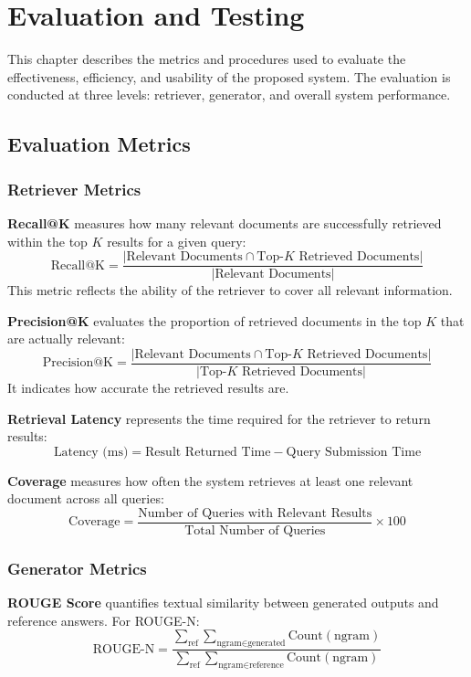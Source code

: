\chapter{Evaluation and Testing}

This chapter describes the metrics and procedures used to evaluate the effectiveness, efficiency, and usability of the proposed system. The evaluation is conducted at three levels: retriever, generator, and overall system performance.

\section{Evaluation Metrics}

\subsection{Retriever Metrics}

\textbf{Recall@K} measures how many relevant documents are successfully retrieved within the top $K$ results for a given query:
\[
\text{Recall@K} = 
\frac{\lvert \text{Relevant Documents} \cap \text{Top-}K \text{ Retrieved Documents} \rvert}
{\lvert \text{Relevant Documents} \rvert}
\]
This metric reflects the ability of the retriever to cover all relevant information.

\textbf{Precision@K} evaluates the proportion of retrieved documents in the top $K$ that are actually relevant:
\[
\text{Precision@K} =
\frac{\lvert \text{Relevant Documents} \cap \text{Top-}K \text{ Retrieved Documents} \rvert}
{\lvert \text{Top-}K \text{ Retrieved Documents} \rvert}
\]
It indicates how accurate the retrieved results are.

\textbf{Retrieval Latency} represents the time required for the retriever to return results:
\[
\text{Latency (ms)} = \text{Result Returned Time} - \text{Query Submission Time}
\]

\textbf{Coverage} measures how often the system retrieves at least one relevant document across all queries:
\[
\text{Coverage} =
\frac{\text{Number of Queries with Relevant Results}}
{\text{Total Number of Queries}} \times 100
\]

\subsection{Generator Metrics}

\textbf{ROUGE Score} quantifies textual similarity between generated outputs and reference answers. For ROUGE-N:
\[
\text{ROUGE-N} =
\frac{
\sum_{\text{ref}} \sum_{\text{ngram} \in \text{generated}} \text{Count}(\text{ngram})
}{
\sum_{\text{ref}} \sum_{\text{ngram} \in \text{reference}} \text{Count}(\text{ngram})
}
\]

